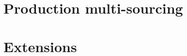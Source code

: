 
\cleardoublepage
\part{Production multi-sourcing}
\label{part:multi-sourcing}





\cleardoublepage
\part{Extensions}
\label{part:extensions}



 



\cleardoublepage
{}





